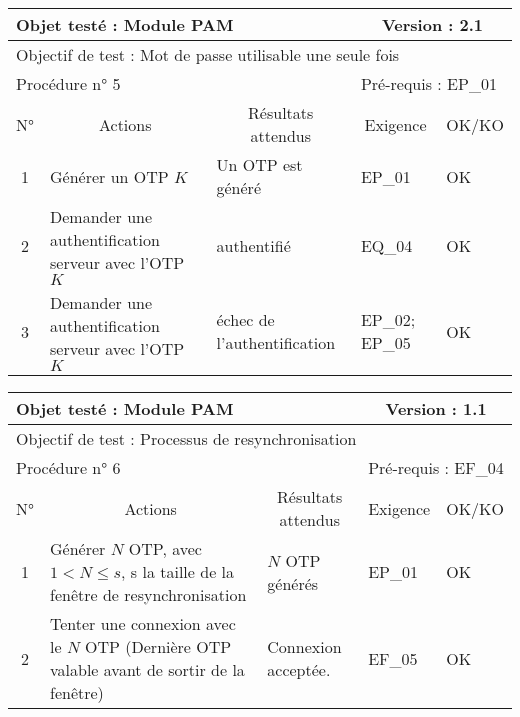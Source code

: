 \documentclass{"../../res/univ-projet"}
\begin{document}
\begin{center}
    \begin{tabular}{|c|p{5cm}|p{5cm}|p{1.5cm}|p{1.5cm}|}
      \hline
      \multicolumn{3}{|l|}{Objet testé : Module PAM} & \multicolumn{2}{c|}{Version : 2.1}\\ \hline
      \multicolumn{5}{|l|}{Objectif de test : Mot de passe utilisable une seule fois}\\ \hline
      \multicolumn{3}{|l|}{Procédure n° 5} & \multicolumn{2}{p{3cm}|}{Pré-requis : EP\_01}\\ \hline
      \multicolumn{1}{|c|}{N°} & \multicolumn{1}{c|}{Actions} & \multicolumn{1}{c|}{Résultats attendus} & 
      \multicolumn{1}{c|}{Exigence} & \multicolumn{1}{c|}{OK/KO}\\ \hline
      1 & Générer un OTP $K$& Un OTP est généré & EP\_01 & OK \\
      2 & Demander une authentification serveur avec l'OTP $K$ & authentifié & EQ\_04 & OK\\
      3 & Demander une authentification serveur avec l'OTP $K$ & échec de l'authentification & EP\_02; EP\_05 & OK\\ \hline
    \end{tabular}
    \vskip 2.5cm
    \begin{tabular}{|c|p{5cm}|p{5cm}|p{1.5cm}|p{1.5cm}|}
      \hline
      \multicolumn{3}{|l|}{Objet testé : Module PAM} & \multicolumn{2}{c|}{Version : 1.1}\\ \hline
      \multicolumn{5}{|l|}{Objectif de test : Processus de resynchronisation}\\ \hline
      \multicolumn{3}{|l|}{Procédure n° 6} & \multicolumn{2}{p{3cm}|}{Pré-requis : EF\_04 }\\ \hline
      \multicolumn{1}{|c|}{N°} & \multicolumn{1}{c|}{Actions} & \multicolumn{1}{c|}{Résultats attendus} & 
      \multicolumn{1}{c|}{Exigence} & \multicolumn{1}{c|}{OK/KO}\\ \hline
      1 & Générer $N$ OTP, avec $1 < N \leq{} s$, s la taille de la fenêtre de resynchronisation& $N$ OTP générés & EP\_01 & OK \\
      2 & Tenter une connexion avec le $N$\up{ième} OTP (Dernière OTP valable avant de sortir de la fenêtre) & Connexion acceptée. & EF\_05 & OK \\ \hline      
    \end{tabular} 

\end{center}
\end{document}
